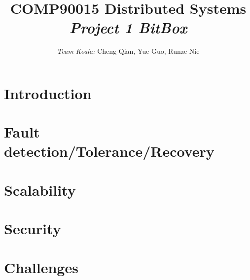 \documentclass[a4paper,12pt]{article}
\begin{document}
\linespread{1.5}
    \title{
    COMP90015 Distributed Systems \\
    \Large \textit{Project 1 BitBox}}
    \author{\textit{Team Koala:} Cheng Qian, Yue Guo, Runze Nie}
    \date{}
    \maketitle

    \section*{Introduction}
   
    
    \section*{Fault detection/Tolerance/Recovery}
    

    \section*{Scalability}
   
    
    \section*{Security}

    \section*{Challenges}
    
    
\end{document}

